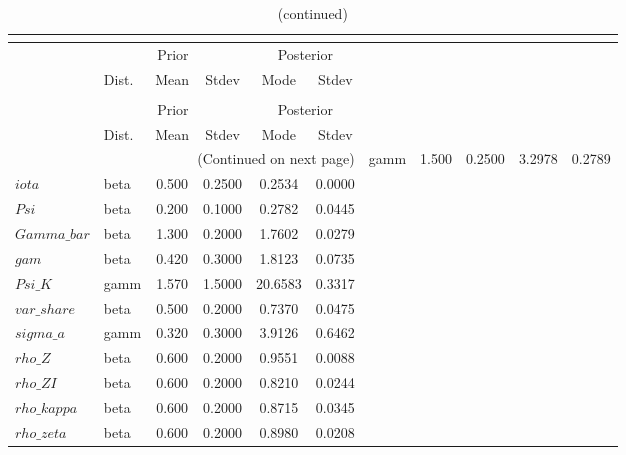  
\begin{center}
\begin{longtable}{llcccc} 
\caption{Results from posterior maximization (parameters)}\\
 \label{Table:Posterior:1}\\
\toprule 
  & \multicolumn{3}{c}{Prior}  &  \multicolumn{2}{c}{Posterior} \\
  \cmidrule(r{.75em}){2-4} \cmidrule(r{.75em}){5-6}
  & Dist. & Mean  & Stdev & Mode & Stdev \\ 
\midrule \endfirsthead 
\caption{(continued)}\\
 \bottomrule 
  & \multicolumn{3}{c}{Prior}  &  \multicolumn{2}{c}{Posterior} \\
  \cmidrule(r{.75em}){2-4} \cmidrule(r{.75em}){5-6}
  & Dist. & Mean  & Stdev & Mode & Stdev \\ 
\midrule \endhead 
\bottomrule \multicolumn{6}{r}{(Continued on next page)}\endfoot 
\bottomrule\endlastfoot 
$sigma$ & gamm &   1.500 & 0.2500 &   3.2978 &  0.2789 \\ 
$iota$ & beta &   0.500 & 0.2500 &   0.2534 &  0.0000 \\ 
$Psi$ & beta &   0.200 & 0.1000 &   0.2782 &  0.0445 \\ 
$Gamma\_bar$ & beta &   1.300 & 0.2000 &   1.7602 &  0.0279 \\ 
$gam$ & beta &   0.420 & 0.3000 &   1.8123 &  0.0735 \\ 
$Psi\_K$ & gamm &   1.570 & 1.5000 &  20.6583 &  0.3317 \\ 
$var\_share$ & beta &   0.500 & 0.2000 &   0.7370 &  0.0475 \\ 
$sigma\_a$ & gamm &   0.320 & 0.3000 &   3.9126 &  0.6462 \\ 
$rho\_Z$ & beta &   0.600 & 0.2000 &   0.9551 &  0.0088 \\ 
$rho\_ZI$ & beta &   0.600 & 0.2000 &   0.8210 &  0.0244 \\ 
$rho\_kappa$ & beta &   0.600 & 0.2000 &   0.8715 &  0.0345 \\ 
$rho\_zeta$ & beta &   0.600 & 0.2000 &   0.8980 &  0.0208 \\ 
\end{longtable}
 \end{center}
